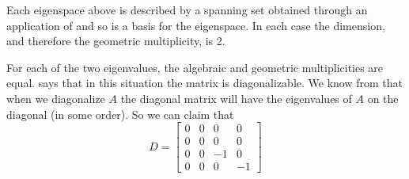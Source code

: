 %
Each eigenspace above is described by a spanning set obtained through an application of  and so is a basis for the eigenspace.  In each case the dimension, and therefore the geometric multiplicity, is 2.\par
%
For each of the two eigenvalues, the algebraic and geometric multiplicities are equal.   says that in this situation the matrix is diagonalizable.  We know from  that when we diagonalize $A$ the diagonal matrix will have the eigenvalues of $A$ on the diagonal (in some order).  So we can claim that
%
\begin{equation*}
D=
\begin{bmatrix}
 0 & 0 & 0 & 0 \\
 0 & 0 & 0 & 0 \\
 0 & 0 & -1 & 0 \\
 0 & 0 & 0 & -1
\end{bmatrix}
\end{equation*}